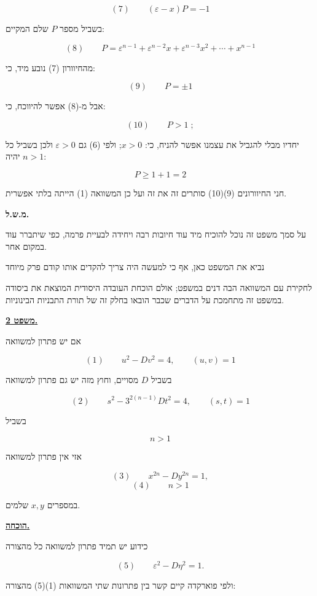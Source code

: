 \[ (7) \qquad (\varepsilon - x)P = -1 \]

בשביל מספר $P$ שלם המקיים:

\[ (8) \qquad P = \varepsilon^{n-1} + \varepsilon^{n-2}x + \varepsilon^{n-3}x^2 + \cdots + x^{n-1} \]

מהחיוורון (7) נובע מיד, כי:

\[ (9) \qquad P = \pm 1 \]

אבל מ-(8) אפשר להיווכח, כי:

\[ (10) \qquad P > 1 \; ; \]

יחדיו מבלי להגביל את עצמנו אפשר להניח, כי: $x > 0$; ולפי (6) גם
$\varepsilon > 0$ ולכן בשביל כל $n > 1$ יהיה:

\[ P \geq 1 + 1 = 2 \]

חני החיוורונים (9)(10) סותרים זה את זה ועל כן המשוואה (1) הייתה
בלתי אפשרית. %

\noindent\textbf{מ.ש.ל.}

על סמך משפט זה נוכל להוכיח מיד עוד חיובות %
רבה ויחידה לבעיית פרמה, כפי שיתברר עוד במקום אחר.

נביא את המשפט כאן, אף כי למעשה היה צריך להקדים אותו קודם פרק מיוחד

\noindent לחקירת עם המשוואה הבה דנים במשפט; אולם הוכחת העובדה היסודית המוצאת
את ביסודה במשפט זה מתחמכת על הדברים שכבר הובאו בחלק זה של תורת
התבניות הבינוניות. %

\noindent\textbf{\underline{משפט 2.}}

אם יש פתרון למשוואה

\[ (1) \qquad u^2 - Dv^2 = 4 , \qquad (u, v) = 1 \]

בשביל $D$ מסויים, וחוץ מזה יש גם פתרון למשוואה

\[ (2) \qquad s^2 - 3^{2(n-1)}Dt^2 = 4 , \qquad (s, t) = 1 \]

בשביל

\[ n > 1 \]

אזי אין פתרון למשוואה

\[ (3) \qquad x^{2n} - Dy^{2n} = 1 , \]
\[ (4) \qquad n > 1 \]

במספרים $x, y$ שלמים.

\noindent\textbf{\underline{הוכחה.}}

כידוע יש תמיד פתרון למשוואה כל מהצורה

\[ (5) \qquad \varepsilon^2 - D\eta^2 = 1 . \]

ולפי פוארקדה %
קיים קשר בין פתרונות שתי המשוואות (1)(5) מהצורה:

